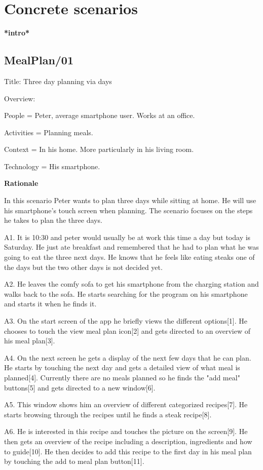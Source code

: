 \section{Concrete scenarios}
\textbf{*intro*}

\subsection{MealPlan/01} \label{MealPlan01}

Title: Three day planning via days

Overview: 

	People = Peter, average smartphone user. Works at an office.
	
	Activities = Planning meals.
	
	Context = In his home. More particularly in his living room.
	
	Technology = His smartphone.
	
\textbf{Rationale}

In this scenario Peter wants to plan three days while sitting at home. He will use his smartphone's touch screen when planning. The scenario focuses on the steps he takes to plan the three days.
	
	A1. It is 10:30 and peter would usually be at work this time a day but today is Saturday. He just ate breakfast and remembered that he had to plan what he was going to eat the three next days. He knows that he feels like eating steaks one of the days but the two other days is not decided yet.
	
	A2. He leaves the comfy sofa to get his smartphone from the charging station and walks back to the sofa. He starts searching for the program on his smartphone and starts it when he finds it.
	
	A3. On the start screen of the app he briefly views the different options[1]. He chooses to touch the view meal plan icon[2] and gets directed to an overview of his meal plan[3]. 
	
	A4. On the next screen he gets a display of the next few days that he can plan. He starts by touching the next day and gets a detailed view of what meal is planned[4]. Currently there are no meals planned so he finds the "add meal" buttons[5] and gets directed to a new window[6]. 
	
	A5. This window shows him an overview of different categorized recipes[7]. He starts browsing through the recipes until he finds a steak recipe[8]. 
	
	A6. He is interested in this recipe and touches the picture on the screen[9]. He then gets an overview of the recipe including a description, ingredients and how to guide[10]. He then decides to add this recipe to the first day in his meal plan by touching the add to meal plan button[11].
	
